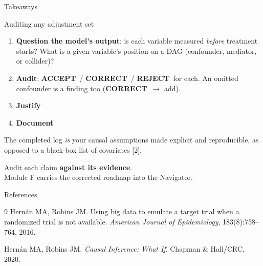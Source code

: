 \documentclass[aspectratio=169]{beamer}
\newcommand{\vaccept}{\textcolor{good}{\textbf{ACCEPT}}}
\newcommand{\vcorrect}{\textcolor{accent}{\textbf{CORRECT}}}
\newcommand{\vreject}{\textcolor{brick}{\textbf{REJECT}}}
\begin{document}
\begin{frame}{Takeaways}
  \small
  \begin{block}{Auditing any adjustment set}
    \begin{enumerate}
      \setlength\itemsep{0.35em}
      \item \textbf{Question the model's output}: is each variable measured \emph{before} treatment starts?
      What is a given variable's position on a DAG (confounder, mediator, or collider)?
      \item \textbf{Audit}: \vaccept\ / \vcorrect\ / \vreject\ for each. An omitted confounder
      is a finding too (\vcorrect\ $\to$ add).
      \item \textbf{Justify}
      \item \textbf{Document}
    \end{enumerate}
  \end{block}
  \vspace{0.5em}

  {\color{black} The completed log \emph{is} your causal assumptions made explicit
  and reproducible, as opposed to a black-box list of covariates [2].}
\end{frame}

\begin{frame}[standout]
  Audit each claim \textbf{against its evidence}.\\[0.8em]
  Module F carries the corrected roadmap into the Navigator.
\end{frame}

\begin{frame}[allowframebreaks]{References}
  \tiny
  
  \begin{thebibliography}{9}
    Hern{\'a}n MA, Robins JM.
    \newblock Using big data to emulate a target trial when a randomized trial is not available.
    \newblock \textit{American Journal of Epidemiology}, 183(8):758--764, 2016.

    Hern{\'a}n MA, Robins JM.
    \newblock \textit{Causal Inference: What If}.
    \newblock Chapman \& Hall/CRC, 2020.

  \end{thebibliography}
\end{frame}
\end{document}

